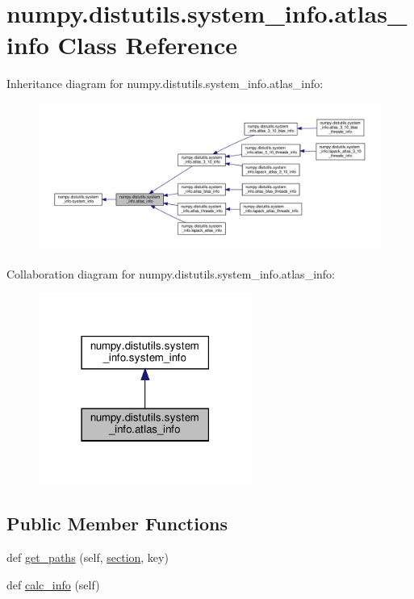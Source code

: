 \hypertarget{classnumpy_1_1distutils_1_1system__info_1_1atlas__info}{}\section{numpy.\+distutils.\+system\+\_\+info.\+atlas\+\_\+info Class Reference}
\label{classnumpy_1_1distutils_1_1system__info_1_1atlas__info}


Inheritance diagram for numpy.\+distutils.\+system\+\_\+info.\+atlas\+\_\+info\+:
\nopagebreak
\begin{figure}[H]
\begin{center}
\leavevmode
\includegraphics[width=350pt]{classnumpy_1_1distutils_1_1system__info_1_1atlas__info__inherit__graph}
\end{center}
\end{figure}


Collaboration diagram for numpy.\+distutils.\+system\+\_\+info.\+atlas\+\_\+info\+:
\nopagebreak
\begin{figure}[H]
\begin{center}
\leavevmode
\includegraphics[width=198pt]{classnumpy_1_1distutils_1_1system__info_1_1atlas__info__coll__graph}
\end{center}
\end{figure}
\subsection*{Public Member Functions}
\begin{DoxyCompactItemize}
\item 
def \hyperlink{classnumpy_1_1distutils_1_1system__info_1_1atlas__info_a04afec9679feea7af5dde56919ee10d9}{get\+\_\+paths} (self, \hyperlink{classnumpy_1_1distutils_1_1system__info_1_1atlas__info_a783f1730add6eb0d13c309da60175318}{section}, key)
\item 
def \hyperlink{classnumpy_1_1distutils_1_1system__info_1_1atlas__info_ae384eb4ce8a413887d8ca571f6a885ef}{calc\+\_\+info} (self)
\end{DoxyCompactItemize}
